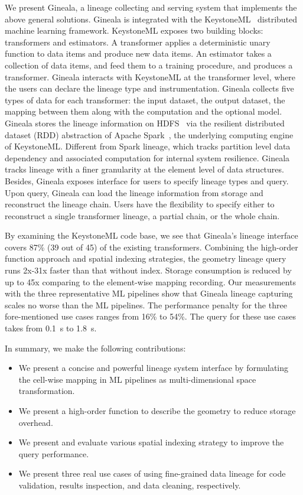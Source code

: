 \documentclass{sig-alternate}
\newenvironment{shortlist}{
        \vspace*{-0.5em}
  \begin{itemize}
  \setlength{\itemsep}{-0.1em}
}{
  \end{itemize}
        \vspace*{-0.5em}
}
\begin{document}
We present Gineala, a lineage collecting and serving system that implements the above general solutions.
Gineala is integrated with the KeystoneML~\cite{sparks15} distributed machine learning framework.
KeystoneML exposes two building blocks: transformers and estimators. 
A transformer applies a deterministic unary function to data items and produce new data items.
An estimator takes a collection of data items, and feed them to a training procedure,  and produces a transformer.
Gineala interacts with KeystoneML at the transformer level, where the users can declare the lineage type and instrumentation.
Gineala collects five types of data for each transformer: the input dataset, the output dataset, the mapping between them
along with the computation and the optional model.
Gineala stores the lineage information on HDFS~\cite{shvachko10} via the resilient distributed dataset (RDD) abstraction
of Apache Spark~\cite{zaharia12}, the underlying computing engine of KeystoneML.
Different from Spark lineage, which tracks partition level data dependency and associated computation for internal system resilience.
Gineala tracks lineage with a finer granularity at the element level of data structures.
Besides, Gineala exposes interface for users to specify lineage types and query.
Upon query, Gineala can load the lineage information from storage and reconstruct the lineage chain.
Users have the flexibility to specify either to reconstruct a single transformer lineage, a partial chain, or the whole chain.

By examining the KeystoneML code base, we see that Gineala's lineage interface covers 87\% (39 out of 45) of the existing transformers.
Combining the high-order function approach and spatial indexing strategies, 
the geometry lineage query runs 2x-31x faster than that without index.
Storage consumption is reduced by up to 45x comparing to the element-wise mapping recording. 
Our measurements with the three representative ML pipelines show that Gineala lineage 
capturing scales no worse than the ML pipelines.
The performance penalty for the three fore-mentioned use cases ranges from 16\% to 54\%.
The query for these use cases takes from 0.1~s to 1.8~s. 

In summary, we make the following contributions:
\begin{shortlist}
\item{} We present a concise and powerful lineage system interface by formulating the cell-wise mapping in ML pipelines as multi-dimensional space transformation.
\item{} We present a high-order function to describe the geometry to reduce storage overhead.
\item{} We present and evaluate various spatial indexing strategy to improve the query performance.
\item{} We present three real use cases of using fine-grained data lineage for code validation, results inspection, and data cleaning, respectively.
\end{shortlist}
\end{document}
